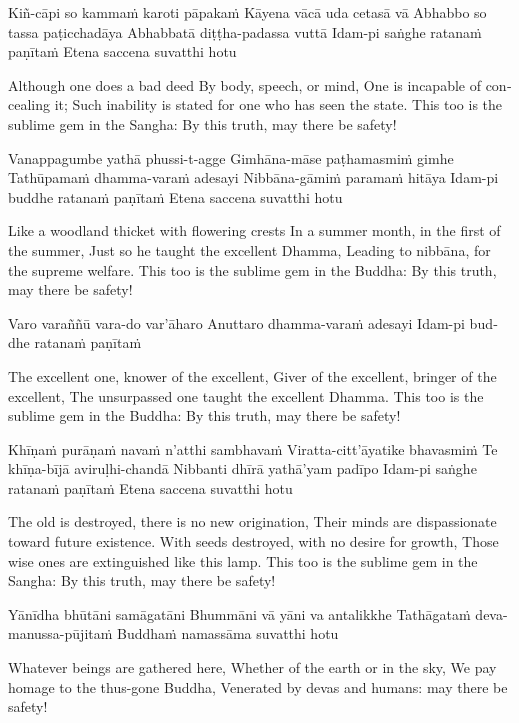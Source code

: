 \begin{english}
\begin{english}
Kiñ-cāpi so kammaṁ karoti pāpakaṁ
Kāyena vācā uda cetasā vā
Abhabbo so tassa paṭicchadāya
Abhabbatā diṭṭha-padassa vuttā
Idam-pi saṅghe ratanaṁ paṇītaṁ
Etena saccena suvatthi hotu

\begin{english}
Although one does a bad deed
By body, speech, or mind,
One is incapable of concealing it;
Such inability is stated for one who has seen the state.
This too is the sublime gem in the Sangha:
By this truth, may there be safety!
\end{english}

Vanappagumbe yathā phussi-t-agge
Gimhāna-māse paṭhamasmiṁ gimhe
Tathūpamaṁ dhamma-varaṁ adesayi
Nibbāna-gāmiṁ paramaṁ hitāya
Idam-pi buddhe ratanaṁ paṇītaṁ
Etena saccena suvatthi hotu

\begin{english}
Like a woodland thicket with flowering crests
In a summer month, in the first of the summer,
Just so he taught the excellent Dhamma,
Leading to nibbāna, for the supreme welfare.
This too is the sublime gem in the Buddha:
By this truth, may there be safety!
\end{english}

Varo varaññū vara-do var’āharo
Anuttaro dhamma-varaṁ adesayi
Idam-pi buddhe ratanaṁ paṇītaṁ

\begin{english}
The excellent one, knower of the excellent,
Giver of the excellent, bringer of the excellent,
The unsurpassed one taught the excellent Dhamma.
This too is the sublime gem in the Buddha:
By this truth, may there be safety!
\end{english}

Khīṇaṁ purāṇaṁ navaṁ n’atthi sambhavaṁ
Viratta-citt’āyatike bhavasmiṁ
Te khīṇa-bījā aviruḷhi-chandā
Nibbanti dhīrā yathā’yam padīpo
Idam-pi saṅghe ratanaṁ paṇītaṁ
Etena saccena suvatthi hotu

\begin{english}
The old is destroyed, there is no new origination,
Their minds are dispassionate toward future existence.
With seeds destroyed, with no desire for growth,
Those wise ones are extinguished like this lamp.
This too is the sublime gem in the Sangha:
By this truth, may there be safety!
\end{english}

Yānīdha bhūtāni samāgatāni
Bhummāni vā yāni va antalikkhe
Tathāgataṁ deva-manussa-pūjitaṁ
Buddhaṁ namassāma suvatthi hotu

\begin{english}
Whatever beings are gathered here,
Whether of the earth or in the sky,
We pay homage to the thus-gone Buddha,
Venerated by devas and humans: may there be safety!
\end{english}


\end{english}
\end{english}
